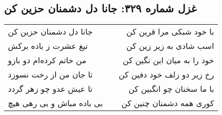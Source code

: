 \begin{center}
\section*{غزل شماره ۳۲۹: جانا دل دشمنان حزین کن}
\label{sec:329}
\begin{longtable}{l p{0.5cm} r}
جانا دل دشمنان حزین کن
&&
با خود شبکی مرا قرین کن
\\
تیغ عشرت ز باده برکش
&&
اسب شادی به زیر زین کن
\\
من خاتم کرده‌ام دو بازو
&&
خود را به میان این نگین کن
\\
تا جان من از رخت نسوزد
&&
رخ زیر دو زلف خود دفین کن
\\
تا عیش عدو چو زهر گردد
&&
با ما سخنان چو انگبین کن
\\
بی باده مباش و بی رهی هیچ
&&
کوری همه دشمنان چنین کن
\\
\end{longtable}
\end{center}
